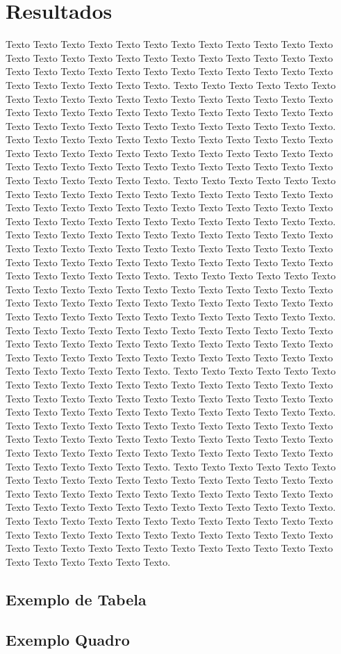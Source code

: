 \chapter{Resultados}
\paragrafo{}
Texto Texto Texto Texto Texto Texto Texto Texto Texto Texto Texto Texto Texto Texto Texto Texto Texto Texto Texto Texto Texto Texto Texto Texto Texto Texto Texto Texto Texto Texto Texto Texto Texto Texto Texto Texto Texto Texto Texto Texto Texto Texto.
\paragrafo{}
Texto Texto Texto Texto Texto Texto Texto Texto Texto Texto Texto Texto Texto Texto Texto Texto Texto Texto Texto Texto Texto Texto Texto Texto Texto Texto Texto Texto Texto Texto Texto Texto Texto Texto Texto Texto Texto Texto Texto Texto Texto Texto.
\paragrafo{}
Texto Texto Texto Texto Texto Texto Texto Texto Texto Texto Texto Texto Texto Texto Texto Texto Texto Texto Texto Texto Texto Texto Texto Texto Texto Texto Texto Texto Texto Texto Texto Texto Texto Texto Texto Texto Texto Texto Texto Texto Texto Texto.
\paragrafo{}
Texto Texto Texto Texto Texto Texto Texto Texto Texto Texto Texto Texto Texto Texto Texto Texto Texto Texto Texto Texto Texto Texto Texto Texto Texto Texto Texto Texto Texto Texto Texto Texto Texto Texto Texto Texto Texto Texto Texto Texto Texto Texto.
\paragrafo{}
Texto Texto Texto Texto Texto Texto Texto Texto Texto Texto Texto Texto Texto Texto Texto Texto Texto Texto Texto Texto Texto Texto Texto Texto Texto Texto Texto Texto Texto Texto Texto Texto Texto Texto Texto Texto Texto Texto Texto Texto Texto Texto.
\paragrafo{}
Texto Texto Texto Texto Texto Texto Texto Texto Texto Texto Texto Texto Texto Texto Texto Texto Texto Texto Texto Texto Texto Texto Texto Texto Texto Texto Texto Texto Texto Texto Texto Texto Texto Texto Texto Texto Texto Texto Texto Texto Texto Texto.
\paragrafo{}
Texto Texto Texto Texto Texto Texto Texto Texto Texto Texto Texto Texto Texto Texto Texto Texto Texto Texto Texto Texto Texto Texto Texto Texto Texto Texto Texto Texto Texto Texto Texto Texto Texto Texto Texto Texto Texto Texto Texto Texto Texto Texto.
\paragrafo{}
Texto Texto Texto Texto Texto Texto Texto Texto Texto Texto Texto Texto Texto Texto Texto Texto Texto Texto Texto Texto Texto Texto Texto Texto Texto Texto Texto Texto Texto Texto Texto Texto Texto Texto Texto Texto Texto Texto Texto Texto Texto Texto.
\paragrafo{}
Texto Texto Texto Texto Texto Texto Texto Texto Texto Texto Texto Texto Texto Texto Texto Texto Texto Texto Texto Texto Texto Texto Texto Texto Texto Texto Texto Texto Texto Texto Texto Texto Texto Texto Texto Texto Texto Texto Texto Texto Texto Texto.
\paragrafo{}
Texto Texto Texto Texto Texto Texto Texto Texto Texto Texto Texto Texto Texto Texto Texto Texto Texto Texto Texto Texto Texto Texto Texto Texto Texto Texto Texto Texto Texto Texto Texto Texto Texto Texto Texto Texto Texto Texto Texto Texto Texto Texto.
\paragrafo{}
Texto Texto Texto Texto Texto Texto Texto Texto Texto Texto Texto Texto Texto Texto Texto Texto Texto Texto Texto Texto Texto Texto Texto Texto Texto Texto Texto Texto Texto Texto Texto Texto Texto Texto Texto Texto Texto Texto Texto Texto Texto Texto.
\section{Exemplo de Tabela}

\section{Exemplo Quadro}
